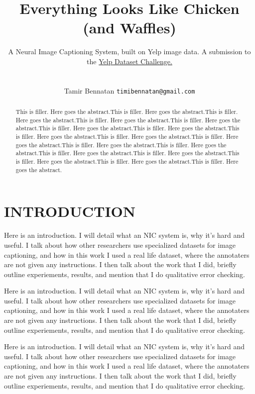 \documentclass[letterpaper, 10 pt, conference]{ieeeconf}
\title{\LARGE \bf
Everything Looks Like Chicken (and Waffles)
}
\author{ \large A Neural Image Captioning System, built on Yelp image data. A submission to the  \href{https://www.yelp.com/dataset/challenge}{Yelp Dataset Challenge.} \\ \\
	\parbox{2 in}{\centering Tamir Bennatan
         {\tt\small timibennatan@gmail.com}
}}
\begin{document}
\nocite{vinyals}
\nocite{tanti1}
\nocite{tanti2}
\nocite{cho}
\nocite{kumar}
\nocite{xu}
\nocite{8k}
\nocite{30k}
\nocite{coco}

\maketitle
\thispagestyle{empty}
\pagestyle{empty}

\begin{abstract}
This is filler. Here goes the abstract.This is filler. Here goes the abstract.This is filler. Here goes the abstract.This is filler. Here goes the abstract.This is filler. Here goes the abstract.This is filler. Here goes the abstract.This is filler. Here goes the abstract.This is filler. Here goes the abstract.This is filler. Here goes the abstract.This is filler. Here goes the abstract.This is filler. Here goes the abstract.This is filler. Here goes the abstract.This is filler. Here goes the abstract.This is filler. Here goes the abstract.This is filler. Here goes the abstract.This is filler. Here goes the abstract.This is filler. Here goes the abstract.
\end{abstract}




\section{INTRODUCTION}

Here is an introduction. I will detail what an NIC system is, why it's hard and useful. I talk about how other researchers use specialized datasets for image captioning, and how in this work I used a real life dataset, where the annotaters are not given any instructions. I then talk about the work that I did, briefly outline experiements, results, and mention that I do qualitative error checking. 

Here is an introduction. I will detail what an NIC system is, why it's hard and useful. I talk about how other researchers use specialized datasets for image captioning, and how in this work I used a real life dataset, where the annotaters are not given any instructions. I then talk about the work that I did, briefly outline experiements, results, and mention that I do qualitative error checking. 

Here is an introduction. I will detail what an NIC system is, why it's hard and useful. I talk about how other researchers use specialized datasets for image captioning, and how in this work I used a real life dataset, where the annotaters are not given any instructions. I then talk about the work that I did, briefly outline experiements, results, and mention that I do qualitative error checking. 
\end{document}
